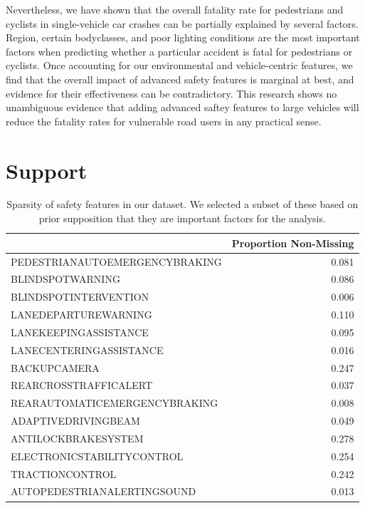 \documentclass[12pt]{article}
\begin{document}
Nevertheless, we have shown that the overall fatality rate for pedestrians and cyclists in single-vehicle car
crashes can be partially explained by several factors. Region, certain bodyclasses, and poor lighting 
conditions are the most important factors when predicting whether a particular accident is fatal 
for pedestrians or cyclists. Once accounting for our environmental and vehicle-centric features, we find 
that the overall impact of advanced safety features is marginal at best, and evidence for their effectiveness
can be contradictory. This research shows no unambiguous evidence that adding advanced saftey features to large vehicles will reduce the fatality rates for vulnerable road users in any practical sense.


\clearpage



\clearpage

\section{Support}

\begin{table}[h]
    \centering
    \begin{tabular}{lr}
        \toprule
         & Proportion Non-Missing \\
        \midrule
        PEDESTRIANAUTOEMERGENCYBRAKING & 0.081 \\
        BLINDSPOTWARNING & 0.086 \\
        BLINDSPOTINTERVENTION & 0.006 \\
        LANEDEPARTUREWARNING & 0.110 \\
        LANEKEEPINGASSISTANCE & 0.095 \\
        LANECENTERINGASSISTANCE & 0.016 \\
        BACKUPCAMERA & 0.247 \\
        REARCROSSTRAFFICALERT & 0.037 \\
        REARAUTOMATICEMERGENCYBRAKING & 0.008 \\
        ADAPTIVEDRIVINGBEAM & 0.049 \\
        ANTILOCKBRAKESYSTEM & 0.278 \\
        ELECTRONICSTABILITYCONTROL & 0.254 \\
        TRACTIONCONTROL & 0.242 \\
        AUTOPEDESTRIANALERTINGSOUND & 0.013 \\
        \bottomrule
    \end{tabular}
    \caption{Sparsity of safety features in our dataset. We selected a subset of these based on prior supposition
    that they are important factors for the analysis.}
    \label{tab:safety_sparsity}
\end{table}
\end{document}
